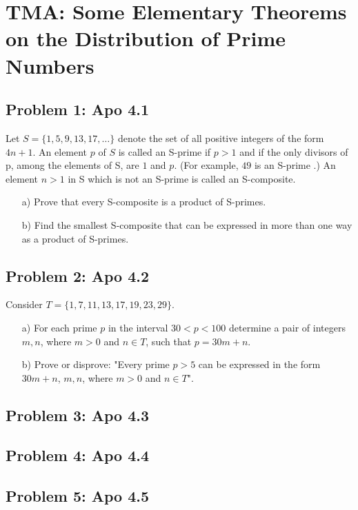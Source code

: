 \section{TMA: Some Elementary Theorems on the Distribution of Prime Numbers}

\subsection[Problem 1]{Problem 1: Apo 4.1}
Let  $S = \{1, 5, 9, 13, 17, \ldots \}$ denote the set of all positive integers of the form $4n + 1$.
An element $p$ of $S$  is called an S-prime if $p > 1$ and if the only divisors of p, among the elements of S,
are $1$ and $p$.  (For example, $49$ is an S-prime .) An element $n > 1$ in S which is not an S-prime is called an
S-composite.
\begin{itemize}
    \item[a)] Prove that every S-composite is a product of S-primes.
    \item[b)] Find the smallest S-composite that can be expressed in  more than one way as a product of S-primes.
\end{itemize}

\subsection[Problem 2]{Problem 2: Apo 4.2}
Consider $T = \{1, 7, 11, 13, 17, 19, 23, 29\}$.
\begin{itemize}
    \item[a)] For each prime $p$ in the interval $30 < p < 100$ determine a pair of integers $m, n$, where $m > 0$
    and $n \in T$, such that $p = 30m +  n$.
    \item[b)] Prove or disprove: "Every prime $p > 5$ can be expressed in the form $30m + n$, $m, n$, where $m > 0$
    and $n \in T$".
\end{itemize}

\subsection[Problem 3]{Problem 3: Apo 4.3}

\subsection[Problem 4]{Problem 4: Apo 4.4}

\subsection[Problem 5]{Problem 5: Apo 4.5}

